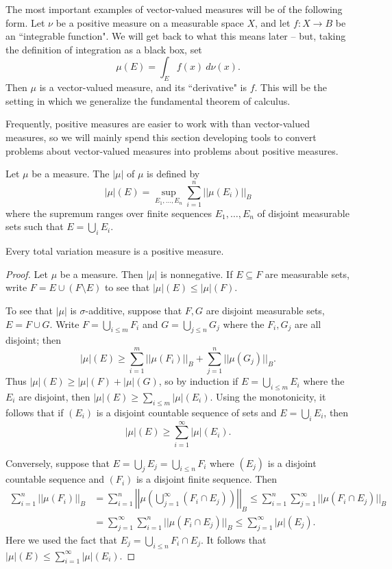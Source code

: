 \begin{example}
The most important examples of vector-valued measures will be of the following form.
Let $\nu$ be a positive measure on a measurable space $X$, and let $f: X \to B$ be an ``integrable function".
We will get back to what this means later -- but, taking the definition of integration as a black box, set
$$\mu(E) = \int_E f(x) ~d\nu(x).$$
Then $\mu$ is a vector-valued measure, and its ``derivative" is $f$.
This will be the setting in which we generalize the fundamental theorem of calculus.
\end{example}

\begin{subsec}
Frequently, positive measures are easier to work with than vector-valued measures, so we will mainly spend this section developing tools to convert problems about vector-valued measures into problems about positive measures.
\end{subsec}

\begin{definition}
Let $\mu$ be a measure. The  $|\mu|$ of $\mu$ is defined by
$$|\mu|(E) = \sup_{E_1, \dots, E_n} \sum_{i=1}^n ||\mu(E_i)||_B$$
where the supremum ranges over finite sequences $E_1, \dots, E_n$ of disjoint measurable sets such that $E = \bigcup_i E_i$.
\end{definition}

\begin{theorem}
Every total variation measure is a positive measure.
\end{theorem}
\begin{proof}
Let $\mu$ be a measure. Then $|\mu|$ is nonnegative. If $E \subseteq F$ are measurable sets, write $F = E \cup (F \setminus E)$ to see that $|\mu|(E) \leq |\mu|(F)$.

To see that $|\mu|$ is $\sigma$-additive, suppose that $F,G$ are disjoint measurable sets, $E = F \cup G$.
Write $F = \bigcup_{i \leq m} F_i$ and $G = \bigcup_{j \leq n} G_j$ where the $F_i,G_j$ are all disjoint; then
$$|\mu|(E) \geq \sum_{i=1}^m ||\mu(F_i)||_B + \sum_{j=1}^n ||\mu(G_j)||_B.$$
Thus $|\mu|(E) \geq |\mu|(F) + |\mu|(G)$, so by induction if $E = \bigcup_{i \leq m} E_i$ where the $E_i$ are disjoint, then $|\mu|(E) \geq \sum_{i \leq m} |\mu|(E_i)$.
Using the monotonicity, it follows that if $(E_i)$ is a disjoint countable sequence of sets and $E = \bigcup_i E_i$, then
$$|\mu|(E) \geq \sum_{i=1}^\infty |\mu|(E_i).$$

Conversely, suppose that $E = \bigcup_j E_j = \bigcup_{i\leq n} F_i$ where $(E_j)$ is a disjoint countable sequence and $(F_i)$ is a disjoint finite sequence. Then
\begin{align*}
\sum_{i=1}^n ||\mu(F_i)||_B &= \sum_{i=1}^n \left|\left|\mu\left(\bigcup_{j=1}^\infty \left(F_i \cap E_j\right)\right)\right|\right|_B \leq \sum_{i=1}^n \sum_{j=1}^\infty ||\mu(F_i \cap E_j)||_B \\
&= \sum_{j=1}^\infty \sum_{i=1}^n ||\mu(F_i \cap E_j)||_B \leq \sum_{j=1}^\infty |\mu|(E_j).
\end{align*}
Here we used the fact that $E_j = \bigcup_{i \leq n} F_i \cap E_j$. It follows that $|\mu|(E) \leq \sum_{i=1}^\infty |\mu|(E_i)$.
\end{proof}

